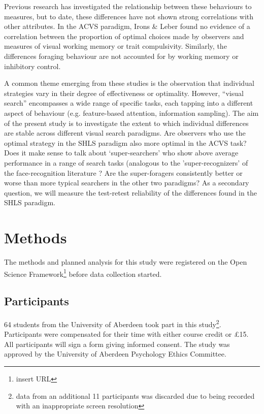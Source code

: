 \documentclass[]{rsos}%
\begin{document}
Previous research has investigated the relationship between these behaviours to  measures, but to date, these differences have not shown strong correlations with other attributes. In the ACVS paradigm, Irons \& Leber found no evidence of a correlation between the proportion of optimal choices made by observers and measures of visual working memory or trait compulsivity\cite{irons-leber2016}. Similarly, the differences foraging behaviour are not accounted for by working memory or inhibitory control\cite{johannesson2017}. 

A common theme emerging from these studies is the observation that individual strategies vary in their degree of effectiveness or optimality. However, ``visual search'' encompasses a wide range of specific tasks, each tapping into a different aspect of behaviour (e.g. feature-based attention, information sampling). The aim of the present study is to investigate the extent to which individual differences are stable across different visual search paradigms. Are observers who use the optimal strategy in the SHLS paradigm also more optimal in the ACVS task? Does it make sense to talk about `super-searchers' who show above average performance in a range of search tasks (analogous to the 'super-recognizers' of the face-recognition literature \cite{russell2009}? Are the super-foragers consistently better or worse than more typical searchers in the other two paradigms? As a secondary question, we will measure the test-retest reliability of the differences found in the SHLS paradigm. 

\section{Methods}

The methods and planned analysis for this study were registered on the Open Science Framework\footnote{insert URL} before data collection started.

\subsection{Participants}
64 students from the University of Aberdeen took part in this study\footnote{data from an additional 11 participants was discarded due to being recorded with an inappropriate screen resolution}. Participants were compensated for their time with either  course credit or \pounds 15. All participants will sign a form giving informed consent. The study was approved by the University of Aberdeen Psychology Ethics Committee. 
\end{document}
